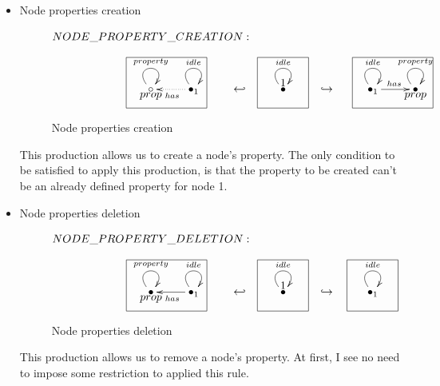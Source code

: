 \documentclass[envcountsect,runningheads]{llncs}
\begin{document}
\begin{itemize}
  \item Node properties creation
  \begin{figure}[H]
    \[
       \xymatrix@C=25pt@R=16pt
       {
         {}\POS[]-<0pc,0pc>\drop{NODE\_PROPERTY\_CREATION:}
         \\
         \\
         \circ \ar@(ul,ur)^{property} \POS[]-<0pc,.5pc>\drop{prop} &
         {\bullet}_{1} \ar@(ul,ur)^{idle} \ar@{.>}^{has}[l]
         \POS[]+<-2pc,.5pc> *+=<6pc,3.8pc>[F-]{} & {\hookleftarrow} &
         {\bullet} \ar@(ul,ur)^{idle}
         \POS[]+<0pc,.5pc> *+=<3.8pc,3.8pc>[F-]{1} & {\hookrightarrow} &
         {\bullet}_{1} \ar@(ul,ur)^{idle} \ar@{->}^{has}[r]
         \POS[]+<1.5pc,.5pc> *+=<6pc,3.8pc>[F-]{} &
         {\bullet} \ar@(ul,ur)^{property} \POS[]-<0pc,.5pc>\drop{prop}
       }
    \]
    \caption{Node properties creation}
    \protect\label{fig:nodecreation}
  \end{figure}
  This production allows us to create a node's property. The only condition to 
  be satisfied to apply this production, is that the property to be created can't be an already
  defined property for node 1.
  
  \item Node properties deletion
  \begin{figure}[H]
    \[
       \xymatrix@C=25pt@R=16pt
       {
         {}\POS[]-<0pc,0pc>\drop{NODE\_PROPERTY\_DELETION:}
         \\
         \\
         {\bullet} \ar@(ul,ur)^{property} \POS[]-<0pc,.5pc>\drop{prop} &
         {\bullet}_{1} \ar@(ul,ur)^{idle} \ar@{->}^{has}[l]
         \POS[]+<-2pc,.5pc> *+=<6pc,3.8pc>[F-]{} & {\hookleftarrow} &
         {\bullet} \ar@(ul,ur)^{idle}
         \POS[]+<0pc,.5pc> *+=<3.8pc,3.8pc>[F-]{1} & {\hookrightarrow} &
         {\bullet}_{1} \ar@(ul,ur)^{idle}
         \POS[]+<0pc,.5pc> *+=<3.8pc,3.8pc>[F-]{}
       }
    \]
    \caption{Node properties deletion}
    \protect\label{fig:nodedeletion}
  \end{figure}
  This production allows us to remove a node's property. At first, I see no need 
  to impose some restriction to applied this rule.\\
  

\end{itemize}
\end{document}
